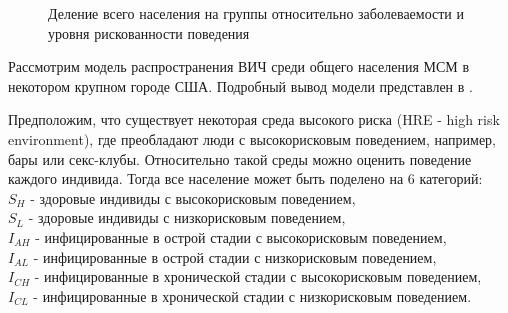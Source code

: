 \documentclass[a4paper]{report}
\begin{document}
	\begin{figure}[htb]
		
	\def\shownum{0}
	\center
		
	\begin{center}
		
	\end{center}

	\caption{Деление всего населения на группы относительно заболеваемости и уровня рискованности поведения} 

	\end{figure}
	Рассмотрим модель распространения ВИЧ среди общего населения МСМ в некотором крупном городе США. Подробный вывод модели представлен в \cite{link20}.
	
	Предположим, что существует некоторая среда высокого риска (HRE - high risk environment), где преобладают люди с высокорисковым поведением, например, бары или секс-клубы. Относительно такой среды можно оценить поведение каждого индивида. Тогда все население может быть поделено на 6 категорий: \\
	$S_H$ - здоровые индивиды с высокорисковым поведением, \\
	$S_L$ - здоровые индивиды с низкорисковым поведением, \\
	$I_{AH}$ - инфицированные в острой стадии с высокорисковым поведением, \\
	$I_{AL}$ - инфицированные в острой стадии с низкорисковым поведением, \\
	$I_{CH}$ - инфицированные в хронической стадии с высокорисковым поведением, \\
	$I_{CL}$ - инфицированные в хронической стадии с низкорисковым поведением. \\
	
\end{document}
